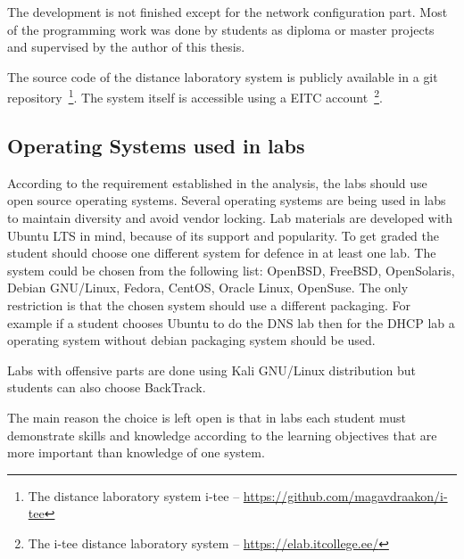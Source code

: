 The development is not finished except for the network configuration part. Most of the programming work was done by students as diploma or master projects and supervised by the author of this thesis.

The source code of the distance laboratory system is publicly available in a \gls{git} repository~\footnote{The distance laboratory system i-tee -- \url{https://github.com/magavdraakon/i-tee}}.
The system itself is accessible using a \gls{EITC} account~\footnote{The i-tee distance laboratory system -- \url{https://elab.itcollege.ee/}}.
%

\subsection{Operating Systems used in labs}

According to the requirement established in the analysis, the labs should use open source operating systems.
Several operating systems are being used in labs to maintain diversity and avoid vendor locking.
Lab materials are developed with Ubuntu LTS in mind, because of its support and popularity. To get graded the student should choose one different system for defence in at least one lab. The system could be chosen from the following list: OpenBSD, FreeBSD, OpenSolaris, Debian GNU/Linux, Fedora, CentOS, Oracle Linux, OpenSuse. The only restriction is that the chosen system should use a different packaging. For example if a student chooses Ubuntu to do the \gls{DNS} lab then for the \gls{DHCP} lab a operating system without debian packaging system should be used.

Labs with offensive parts are done using Kali GNU/Linux distribution but students can also choose BackTrack.

The main reason the choice is left open is that in labs each student must demonstrate skills and knowledge according to the learning objectives that are more important than knowledge of one system.

